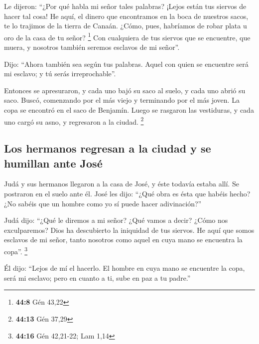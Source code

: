  Le dijeron: ``¿Por qué habla mi señor tales palabras?
¡Lejos están tus siervos de hacer tal cosa!  He aquí, el
dinero que encontramos en la boca de nuestros sacos, te lo trajimos de
la tierra de Canaán. ¿Cómo, pues, habríamos de robar plata u oro de la
casa de tu señor? \footnote{\textbf{44:8} Gén 43,22}  Con
cualquiera de tus siervos que se encuentre, que muera, y nosotros
también seremos esclavos de mi señor''.

 Dijo: ``Ahora también sea según tus palabras. Aquel con
quien se encuentre será mi esclavo; y tú serás irreprochable''.

 Entonces se apresuraron, y cada uno bajó su saco al
suelo, y cada uno abrió su saco.  Buscó, comenzando por
el más viejo y terminando por el más joven. La copa se encontró en el
saco de Benjamín.  Luego se rasgaron las vestiduras, y
cada uno cargó su asno, y regresaron a la ciudad. \footnote{\textbf{44:13}
  Gén 37,29}

\hypertarget{los-hermanos-regresan-a-la-ciudad-y-se-humillan-ante-josuxe9}{%
\subsection{Los hermanos regresan a la ciudad y se humillan ante
José}\label{los-hermanos-regresan-a-la-ciudad-y-se-humillan-ante-josuxe9}}

 Judá y sus hermanos llegaron a la casa de José, y éste
todavía estaba allí. Se postraron en el suelo ante él. 
José les dijo: ``¿Qué obra es ésta que habéis hecho? ¿No sabéis que un
hombre como yo sí puede hacer adivinación?''

 Judá dijo: ``¿Qué le diremos a mi señor? ¿Qué vamos a
decir? ¿Cómo nos exculparemos? Dios ha descubierto la iniquidad de tus
siervos. He aquí que somos esclavos de mi señor, tanto nosotros como
aquel en cuya mano se encuentra la copa''. \footnote{\textbf{44:16} Gén
  42,21-22; Lam 1,14}

 Él dijo: ``Lejos de mí el hacerlo. El hombre en cuya
mano se encuentre la copa, será mi esclavo; pero en cuanto a ti, sube en
paz a tu padre.''

